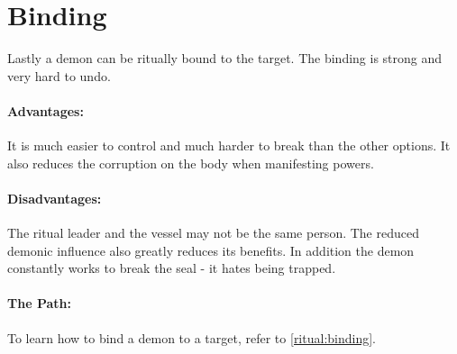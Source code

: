 \section{Binding}
\label{possession:binding}
Lastly a demon can be ritually bound to the target.
The binding is strong and very hard to undo.
\paragraph{Advantages:}
It is much easier to control and much harder to break than the other options.
It also reduces the corruption on the body when manifesting powers.
\paragraph{Disadvantages:}
The ritual leader and the vessel may not be the same person.
The reduced demonic influence also greatly reduces its benefits.
In addition the demon constantly works to break the seal - it hates being trapped.
\paragraph{The Path:}
To learn how to bind a demon to a target, refer to \ref{ritual:binding}.
